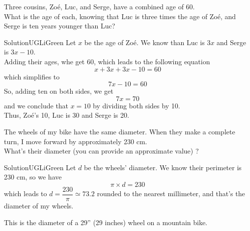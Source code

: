 \documentclass[12pt,a4paper,article,english,firamath]{nsi}
\begin{document}
\maketitle

\begin{exercice}[]
    Three cousins, Zoé, Luc, and Serge, have a combined age of 60.\\
    
    What is the age of each, knowing that Luc is three times the age of Zoé, and Serge is ten years younger than Luc?
\end{exercice}

\begin{encadrecolore}{Solution}{UGLiGreen}
    Let $x$ be the age of Zoé. We know than Luc is $3x$ and Serge is $3x-10$.\\
    Adding their ages, whe get 60, which leads to the following equation
    $$x + 3x + 3x-10 = 60$$
    which simplifies to
    $$7x - 10 = 60$$
    So, adding ten on both sides, we get $$7x = 70$$
    and we conclude that $x = 10$ by dividing both sides by 10.\\

    Thus, Zoé's 10, Luc is 30 and Serge is 20.
\end{encadrecolore}

\begin{exercice}[]
    The wheels of my bike have the same diameter. When they make a complete turn, I move forward by approximately 230 cm.\\

    What's their diameter (you can provide an approximate value) ?
\end{exercice}

\begin{encadrecolore}{Solution}{UGLiGreen}
    Let $d$ be the wheels' diameter. We know their perimeter is 230 cm, so we have
    $$\pi \times d = 230$$
    which leads to $d = \dfrac{230}{\pi}\simeq 73.2$ rounded to the nearest millimeter, and that's the diameter of my wheels. 
\end{encadrecolore}

\begin{remarque}[]
    This is the diameter of a 29'' (29 inches) wheel on a mountain bike. 
\end{remarque}
\end{document}
